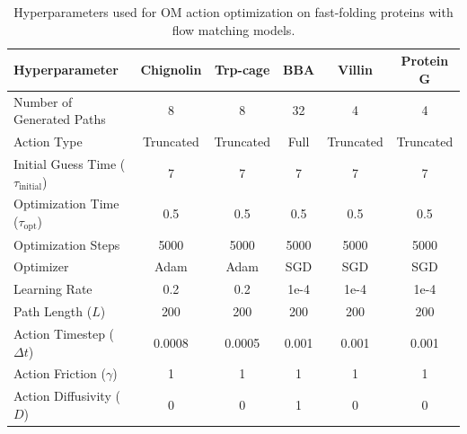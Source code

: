 \begin{table}[h]
\caption{Hyperparameters used for OM action optimization on fast-folding proteins with flow matching models.}
\label{tab:om_optimization_details_flow}
\scriptsize
\centering
    \begin{tabular}{lccccc}
        \toprule
        \textbf{Hyperparameter} & \textbf{Chignolin} & \textbf{Trp-cage} & \textbf{BBA} & \textbf{Villin} & \textbf{Protein G} \\
        \midrule
        Number of Generated Paths & 8 & 8 & 32 & 4 & 4 \\
        Action Type & Truncated & Truncated & Full & Truncated & Truncated \\
        Initial Guess Time ($\tau_\text{initial}$) & 7 & 7 & 7 & 7 & 7 \\
        Optimization Time ($\tau_\text{opt}$) & 0.5 & 0.5 & 0.5 & 0.5 & 0.5 \\
        Optimization Steps & 5000 & 5000 & 5000 & 5000 & 5000 \\
        Optimizer & Adam & Adam & SGD & SGD & SGD \\
        Learning Rate & 0.2 & 0.2 & 1e-4 & 1e-4 & 1e-4 \\
        Path Length ($L$) & 200 & 200 & 200 & 200 & 200 \\
        Action Timestep ($\Delta t$) & 0.0008 & 0.0005 & 0.001 & 0.001 & 0.001 \\
        Action Friction ($\gamma$) & 1 & 1 & 1 & 1 & 1 \\
        Action Diffusivity ($D$) & 0 & 0 & 1 & 0 & 0 \\
        \bottomrule
    \end{tabular}
\end{table}


